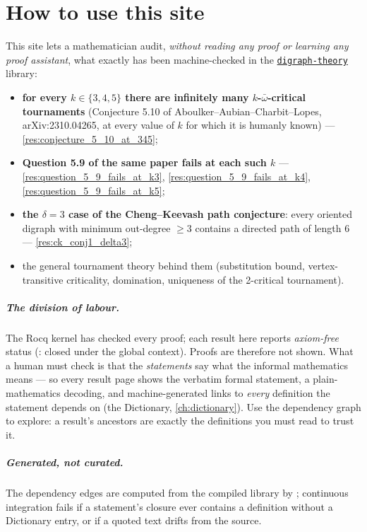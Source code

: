 \chapter{How to use this site}
\label{ch:intro}

This site lets a mathematician audit, \emph{without reading any proof
or learning any proof assistant}, what exactly has been
machine-checked in the
\href{https://github.com/LLM4Rocq/digraph-theory}{\texttt{digraph-theory}}
library:

\begin{itemize}
\item \textbf{for every $k \in \{3,4,5\}$ there are infinitely many
  $k$-$\bar\omega$-critical tournaments} (Conjecture 5.10 of
  Aboulker--Aubian--Charbit--Lopes, arXiv:2310.04265, at every value
  of $k$ for which it is humanly known) ---
  \ref{res:conjecture_5_10_at_345};
\item \textbf{Question 5.9 of the same paper fails at each such $k$}
  --- \ref{res:question_5_9_fails_at_k3},
  \ref{res:question_5_9_fails_at_k4},
  \ref{res:question_5_9_fails_at_k5};
\item \textbf{the $\delta = 3$ case of the Cheng--Keevash path
  conjecture}: every oriented digraph with minimum out-degree $\ge 3$
  contains a directed path of length 6 ---
  \ref{res:ck_conj1_delta3};
\item the general tournament theory behind them (substitution bound,
  vertex-transitive criticality, domination,
  uniqueness of the 2-critical tournament).
\end{itemize}

\paragraph{The division of labour.} The Rocq kernel has checked every
proof; each result here reports \emph{axiom-free} status
(: closed under the global context). Proofs
are therefore not shown. What a human must check is that the
\emph{statements} say what the informal mathematics means --- so every
result page shows the verbatim formal statement, a plain-mathematics
decoding, and machine-generated  links to \emph{every}
definition the statement depends on (the Dictionary,
\ref{ch:dictionary}). Use the dependency graph to explore: a result's
ancestors are exactly the definitions you must read to trust it.

\paragraph{Generated, not curated.} The dependency edges are computed
from the compiled library by ;
continuous integration fails if a statement's closure ever contains a
definition without a Dictionary entry, or if a quoted text drifts
from the source.

